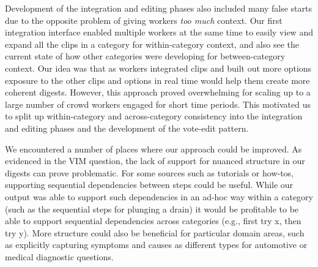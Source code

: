 Development of the integration and editing phases also included many false starts due to the opposite problem of giving workers \textit{too much} context. Our first integration interface enabled multiple workers at the same time to easily view and expand all the clips in a category for within-category context, and also see the current state of how other categories were developing for between-category context. Our idea was that as workers integrated clips and built out more options exposure to the other clips and options in real time would help them create more coherent digests. However, this approach proved overwhelming for scaling up to a large number of crowd workers engaged for short time periods. This motivated us to split up within-category and across-category consistency into the integration and editing phases and the development of the vote-edit pattern.

We encountered a number of places where our approach could be improved. As evidenced in the VIM question, the lack of support for nuanced structure in our digests can prove problematic. For some sources such as tutorials or how-tos, supporting sequential dependencies between steps could be useful. While our output was able to support such dependencies in an ad-hoc way within a category (such as the sequential steps for plunging a drain) it would be profitable to be able to support sequential dependencies across categories (e.g., first try x, then try y). More structure could also be beneficial for particular domain areas, such as explicitly capturing symptoms and causes as different types for automotive or medical diagnostic questions.



